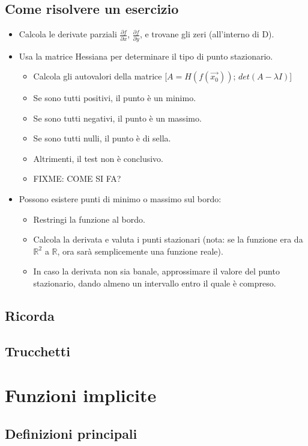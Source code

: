 \documentclass[a4paper,10pt]{book}
\begin{document}
\subsection{Come risolvere un esercizio}
\begin{itemize}
\item Calcola le derivate parziali $\frac{\partial f}{\partial x}$, $\frac{\partial f}{\partial y}$, e trovane gli zeri (all'interno di D).
\item Usa la matrice Hessiana per determinare il tipo di punto stazionario.
\begin{itemize}
 \item Calcola gli autovalori della matrice [$A = H(f(\vec{x_0}))$; $det(A-\lambda I)$]
 \item Se sono tutti positivi, il punto è un minimo.
 \item Se sono tutti negativi, il punto è un massimo.
 \item Se sono tutti nulli, il punto è di sella.
 \item Altrimenti, il test non è conclusivo.
 \item FIXME: COME SI FA?
\end{itemize}
\item Possono esistere punti di minimo o massimo sul bordo:
\begin{itemize}
 \item Restringi la funzione al bordo.
 \item Calcola la derivata e valuta i punti stazionari (nota: se la funzione era da $\mathbb{R}^2$ a $\mathbb{R}$, ora sarà semplicemente una funzione reale).
 \item In caso la derivata non sia banale, approssimare il valore del punto stazionario, dando almeno un intervallo entro il quale è compreso.
\end{itemize}
\end{itemize}

\subsection{Ricorda}
\subsection{Trucchetti}

\section{Funzioni implicite}
\subsection{Definizioni principali}
\end{document}
